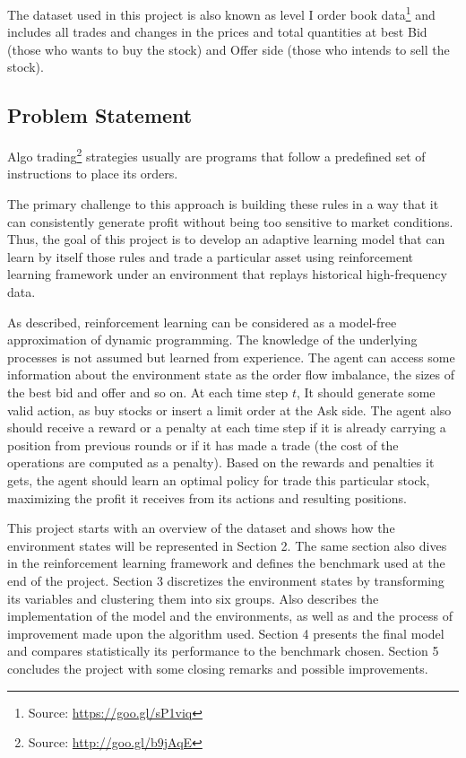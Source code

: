 \documentclass[a4paper]{article}
\begin{document}
The dataset used in this project is also known as level I order book data\footnote{Source: \url{https://goo.gl/sP1viq}} and includes all trades and changes in the prices and total quantities at best Bid (those who wants to buy the stock) and Offer side (those who intends to sell the stock).


\subsection{Problem Statement}
Algo trading\footnote{Source: \url{http://goo.gl/b9jAqE}} strategies usually are programs that follow a predefined set of instructions to place its orders.

The primary challenge to this approach is building these rules in a way that it can consistently generate profit without being too sensitive to market conditions. Thus, the goal of this project is to develop an adaptive learning model that can learn by itself those rules and trade a particular asset using reinforcement learning framework under an environment that replays historical high-frequency data.

As \cite{chan2001electronic} described, reinforcement learning can be considered as a model-free approximation of dynamic programming. The knowledge of the underlying processes is not assumed but learned from experience. The agent can access some information about the environment state as the order flow imbalance, the sizes of the best bid and offer and so on. At each time step $t$, It should generate some valid action, as buy stocks or insert a limit order at the Ask side. The agent also should receive a reward or a penalty at each time step if it is already carrying a position from previous rounds or if it has made a trade (the cost of the operations are computed as a penalty). Based on the rewards and penalties it gets, the agent should learn an optimal policy for trade this particular stock, maximizing the profit it receives from its actions and resulting positions.

This project starts with an overview of the dataset and shows how the environment states will be represented in Section 2. The same section also dives in the reinforcement learning framework and defines the benchmark used at the end of the project. Section 3 discretizes the environment states by transforming its variables and clustering them into six groups. Also describes the implementation of the model and the environments, as well as and the process of improvement made upon the algorithm used. Section 4 presents the final model and compares statistically its performance to the benchmark chosen. Section 5 concludes the project with some closing remarks and possible improvements.
\end{document}

